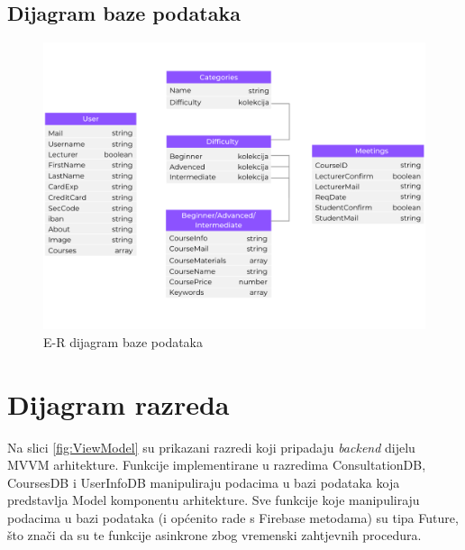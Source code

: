 			\subsection{Dijagram baze podataka}
				\begin{figure}[H]
					\includegraphics[scale=0.6]{dijagrami/ER_baza_podataka.PNG} 
					\centering
					\caption{E-R dijagram baze podataka}
					\label{fig:ER}
				\end{figure} 
			
			\eject
			
			
		\section{Dijagram razreda}
		
			Na slici \ref{fig:ViewModel} su prikazani razredi koji pripadaju \textit{backend} dijelu MVVM arhitekture. Funkcije implementirane u razredima ConsultationDB, CoursesDB i UserInfoDB manipuliraju podacima u bazi podataka koja predstavlja Model komponentu arhitekture. Sve funkcije koje manipuliraju podacima u bazi podataka (i općenito rade s Firebase metodama) su tipa Future, što znači da su te funkcije asinkrone zbog vremenski zahtjevnih procedura.
			
